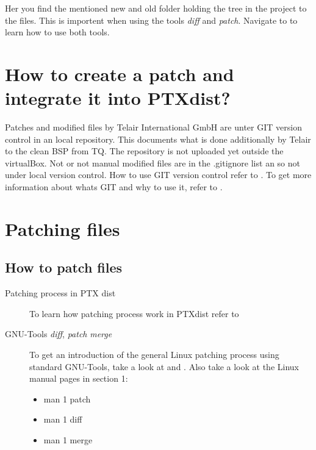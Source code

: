 Her you find the mentioned new and old folder holding the tree in the project
to the files. This is importent when using the tools \textit{diff} and
\textit{patch}. Navigate to  to learn how to use both
tools.



\section{How to create a patch and integrate it into PTXdist?}%
\label{sec:?}

Patches and modified files by Telair International GmbH are unter GIT version
control in an local repository. This documents what is done additionally
by Telair to the clean BSP from TQ. The repository is not uploaded yet outside
the virtualBox. Not or not manual modified files are in the .gitignore list an
so not under local version control. How to use GIT version control refer to
\cite[GIT howto]{git_howto}. To get more information about whats GIT and why to
use it, refer to \cite[GIT Homepage]{git_homepage}.










\section{Patching files}%
\label{sec:Pached files}

\subsection{How to patch files}%
\label{sub:howto_patch}
\begin{description}
    \item[Patching process in PTX dist]
        To learn how patching process work in PTXdist refer to \cite{todo}
    \item[GNU-Tools \textit{diff},  \textit{patch} \textit{merge}] To get an
        introduction of the general Linux patching process using
        standard GNU-Tools, take a look at
        \cite[GNU Diff and Patch]{GNUPatchTools:Patch_Diff_Exaples} and
        \cite[GNU Merge]{GNUPatchTools:Merge_Examples}. Also take a look at the
        Linux manual pages in section 1:
        \begin{itemize}
            \item man 1 patch
            \item man 1 diff
            \item man 1 merge
        \end{itemize}
\end{description}

